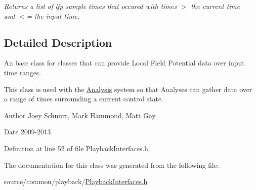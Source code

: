 \begin{DoxyCompactItemize}
\begin{DoxyCompactList}\small\item\em Returns a list of lfp sample times that occured with times $>$ the current time and $<$= the input time. \end{DoxyCompactList}\end{DoxyCompactItemize}


\subsection{Detailed Description}
An base class for classes that can provide Local Field Potential data over input time ranges. 

This class is used with the \hyperlink{class_picto_1_1_analysis}{Analysis} system so that Analyses can gather data over a range of times surrounding a current control state. \begin{DoxyAuthor}{Author}
Joey Schnurr, Mark Hammond, Matt Gay 
\end{DoxyAuthor}
\begin{DoxyDate}{Date}
2009-\/2013 
\end{DoxyDate}


Definition at line 52 of file Playback\-Interfaces.\-h.



The documentation for this class was generated from the following file\-:\begin{DoxyCompactItemize}
\item 
source/common/playback/\hyperlink{_playback_interfaces_8h}{Playback\-Interfaces.\-h}\end{DoxyCompactItemize}
